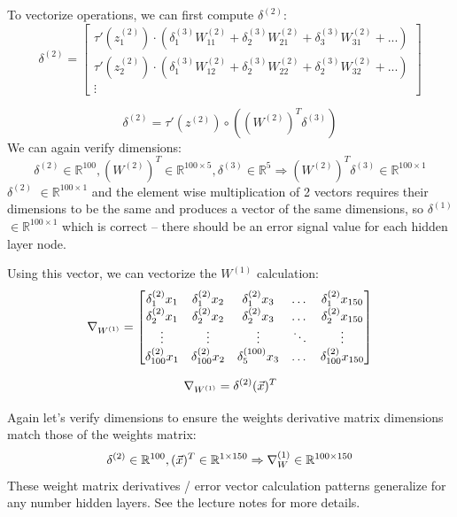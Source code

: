 \documentclass[]{article}
\newcommand{\slayer}[3]{ %
	\ensuremath{{#1}^{(#2)}_{#3}}}
\newcommand{\vlayer}[2]{ %
	\ensuremath{{#1}^{(#2)}}}
\newcommand{\reals}[1]{ %
	\ensuremath{\in \mathbb{R}^{#1}}}
\begin{document}
To vectorize operations, we can first compute \vlayer{\delta}{2}:
\[
\vlayer{\delta}{2} = 
\begin{bmatrix}
\tau'(\slayer{z}{2}{1}) \cdot (\slayer{\delta}{3}{1}\slayer{W}{2}{11} + \slayer{\delta}{3}{2}\slayer{W}{2}{21} + \slayer{\delta}{3}{3}\slayer{W}{2}{31} + ... ) \\
\tau'(\slayer{z}{2}{2}) \cdot (\slayer{\delta}{3}{1}\slayer{W}{2}{12} + \slayer{\delta}{3}{2}\slayer{W}{2}{22} + \slayer{\delta}{3}{2}\slayer{W}{2}{32} + ... ) \\
\vdots 
\end{bmatrix}
\]

\begin{equation}\label{eq:d2}
	\vlayer{\delta}{2} = \tau'(\vlayer{z}{2}) \circ \left((\vlayer{W}{2})^T\vlayer{\delta}{3}\right)
\end{equation}
We can again verify dimensions:
$$\vlayer{\delta}{2}\reals{100},(\vlayer{W}{2})^T\reals{100\times5},\vlayer{\delta}{3}\reals{5}\Rightarrow(\vlayer{W}{2})^T\vlayer{\delta}{3}\reals{100\times1}$$
\vlayer{\delta}{2}\reals{100\times1} and the element wise multiplication of 2 vectors requires their dimensions to be the same and produces a vector of the same dimensions, so \vlayer{\delta}{1}\reals{100\times1} which is correct -- there should be an error signal value for each hidden layer node.

Using this vector, we can vectorize the \vlayer{W}{1} calculation:
\[
\nabla_{\vlayer{W}{1}} = 
\begin{bmatrix}
\slayer{\delta}{2}{1}x_1       & \slayer{\delta}{2}{1}x_2 & \slayer{\delta}{2}{1}x_3 & \dots & \slayer{\delta}{2}{1}x_{150} \\
\slayer{\delta}{2}{2}x_1       & \slayer{\delta}{2}{2}x_2 & \slayer{\delta}{2}{2}x_3 & \dots & \slayer{\delta}{2}{2}x_{150} \\
\vdots	& \vdots	&\vdots	&\ddots	& \vdots \\
\slayer{\delta}{2}{100}x_1       & \slayer{\delta}{2}{100}x_2 & \slayer{\delta}{100}{5}x_3 & \dots & \slayer{\delta}{2}{100}x_{150} \\
\end{bmatrix}
\]

\begin{equation}\label{eq:W1}
	\nabla_{\vlayer{W}{1}} = \vlayer{\delta}{2}(\vec{x})^T
\end{equation}

Again let's verify dimensions to ensure the weights derivative matrix dimensions match those of the weights matrix:
$$\vlayer{\delta}{2}\reals{100},(\vec{x})^T\reals{1\times150}\Rightarrow\nabla_\vlayer{W}{1}\reals{100\times150}$$
These weight matrix derivatives / error vector calculation patterns generalize for any number hidden layers. See the lecture notes for more details.
\end{document}
